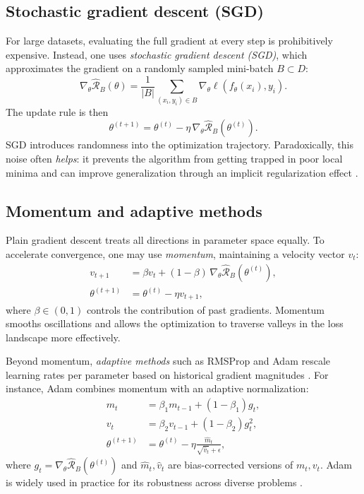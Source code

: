\subsection{Stochastic gradient descent (SGD)}
For large datasets, evaluating the full gradient at every step is prohibitively 
expensive. Instead, one uses \emph{stochastic gradient descent (SGD)}, which 
approximates the gradient on a randomly sampled mini-batch $B \subset D$:  
\begin{equation}
  \nabla_\theta \hat{\mathcal{R}}_B(\theta) 
  = \frac{1}{|B|}\sum_{(x_i,y_i)\in B} \nabla_\theta \ell(f_\theta(x_i),y_i).
\end{equation}
The update rule is then
\begin{equation}
  \theta^{(t+1)} = \theta^{(t)} - \eta \,\nabla_\theta \hat{\mathcal{R}}_B(\theta^{(t)}).
\end{equation}
SGD introduces randomness into the optimization trajectory. 
Paradoxically, this noise often \emph{helps}: it prevents the algorithm 
from getting trapped in poor local minima and can improve generalization 
through an implicit regularization effect \cite{wu2022alignmentpropertysgdnoise,Berner_2022}.  

\subsection{Momentum and adaptive methods}
Plain gradient descent treats all directions in parameter space equally.  
To accelerate convergence, one may use \emph{momentum}, maintaining a velocity 
vector $v_t$:
\begin{align}
  v_{t+1} &= \beta v_t + (1-\beta)\,\nabla_\theta \hat{\mathcal{R}}_B(\theta^{(t)}), \\
  \theta^{(t+1)} &= \theta^{(t)} - \eta v_{t+1},
\end{align}
where $\beta \in (0,1)$ controls the contribution of past gradients.  
Momentum smooths oscillations and allows the optimization to traverse 
valleys in the loss landscape more effectively.  

Beyond momentum, \emph{adaptive methods} such as RMSProp and Adam 
rescale learning rates per parameter based on historical gradient magnitudes \cite{KingmaBa2015-Adam}. 
For instance, Adam combines momentum with an adaptive normalization:  
\begin{align}
  m_t &= \beta_1 m_{t-1} + (1-\beta_1) g_t, \\
  v_t &= \beta_2 v_{t-1} + (1-\beta_2) g_t^2, \\
  \theta^{(t+1)} &= \theta^{(t)} - \eta \frac{\hat{m}_t}{\sqrt{\hat{v}_t} + \epsilon},
\end{align}
where $g_t=\nabla_\theta \hat{\mathcal{R}}_B(\theta^{(t)})$ and 
$\hat{m}_t, \hat{v}_t$ are bias-corrected versions of $m_t, v_t$.  
Adam is widely used in practice for its robustness across diverse problems \cite{ZhangEtAl2022-AdamConverges}.  

